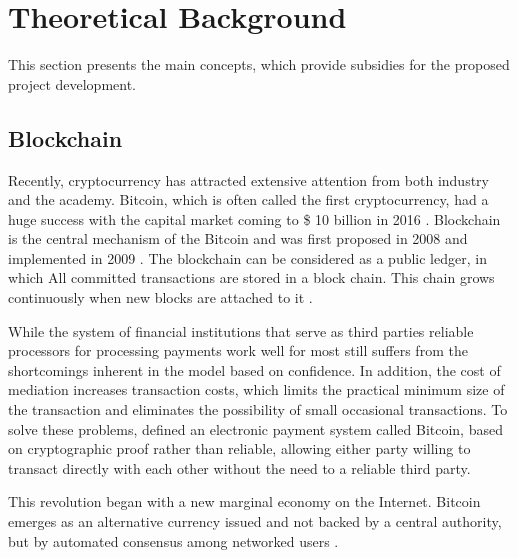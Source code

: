\section{Theoretical Background} \label{sec:Theoretical}

This section presents the main concepts, which provide subsidies for the proposed project development.


%
%
% 
%

\subsection{Blockchain}\label{sec:blockchain}
Recently, cryptocurrency has attracted extensive attention from both industry and the academy. Bitcoin, which is often called the first cryptocurrency, had a huge success with the capital market coming to \$ 10 billion in 2016 \cite{coindesk}. Blockchain is the central mechanism of the Bitcoin and was first proposed in 2008 and implemented in 2009 \cite{nakamoto2008bitcoin}. The blockchain can be considered as a public ledger, in which All committed transactions are stored in a block chain. This chain grows continuously when new blocks are attached to it \cite{zheng2016blockchain}.

While the system of financial institutions that serve as third parties reliable processors for processing payments work well for most still suffers from the shortcomings inherent in the model based on confidence. In addition, the cost of mediation increases transaction costs, which limits the practical minimum size of the transaction and eliminates the possibility of small occasional transactions. To solve these problems, \cite{nakamoto2008bitcoin} defined an electronic payment system called Bitcoin, based on cryptographic proof rather than reliable, allowing either party willing to transact directly with each other without the need to a reliable third party.

This revolution began with a new marginal economy on the Internet. Bitcoin emerges as an alternative currency issued and not backed by a central authority, but by automated consensus among networked users \cite{swan2015blockchain}.

